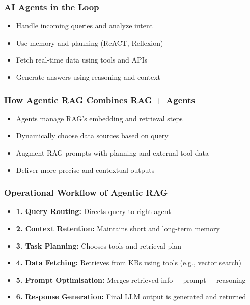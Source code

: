 \begin{frame}[fragile]\frametitle{AI Agents in the Loop}
    \begin{itemize}
        \item Handle incoming queries and analyze intent
        \item Use memory and planning (ReACT, Reflexion)
        \item Fetch real-time data using tools and APIs
        \item Generate answers using reasoning and context
    \end{itemize}
\end{frame}

\begin{frame}[fragile]\frametitle{How Agentic RAG Combines RAG + Agents}
    \begin{itemize}
        \item Agents manage RAG's embedding and retrieval steps
        \item Dynamically choose data sources based on query
        \item Augment RAG prompts with planning and external tool data
        \item Deliver more precise and contextual outputs
    \end{itemize}
\end{frame}

\begin{frame}[fragile]\frametitle{Operational Workflow of Agentic RAG}
    \begin{itemize}
        \item \textbf{1. Query Routing:} Directs query to right agent
        \item \textbf{2. Context Retention:} Maintains short and long-term memory
        \item \textbf{3. Task Planning:} Chooses tools and retrieval plan
        \item \textbf{4. Data Fetching:} Retrieves from KBs using tools (e.g., vector search)
        \item \textbf{5. Prompt Optimisation:} Merges retrieved info + prompt + reasoning
        \item \textbf{6. Response Generation:} Final LLM output is generated and returned
    \end{itemize}
\end{frame}

